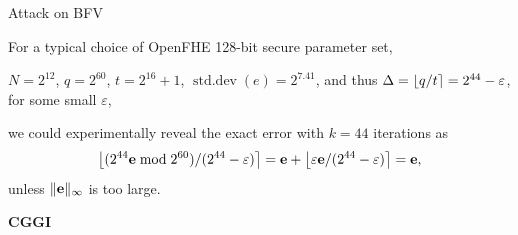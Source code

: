 \documentclass[handout]{beamer}
\begin{document}
    \begin{frame}{\krd Attack on BFV} 

    {

    For a typical choice of OpenFHE 128-bit secure parameter set, \vspace{0.3cm}
    
    $N = 2^{12}$, $q=2^{60}$, $t = 2^{16}+1$, $\operatorname{std.dev}(e) = 2^{7.41}$, and thus $\Delta = \left\lfloor q/t \right\rceil = 2^{44}-\varepsilon$, for some small $\varepsilon$, \vspace{0.3cm}
    
    we could experimentally reveal the exact error with $k=44$ iterations as
    \[
        \left\lfloor ({2^{44}\mathbf{e} \bmod 2^{60}})/(2^{44}-\varepsilon) \right\rceil = \mathbf{e} + \left\lfloor \varepsilon\mathbf{e} / (2^{44}-\varepsilon) \right\rceil = \mathbf{e},
    \]
    unless $\Vert\mathbf{e}\Vert_\infty$ is too large. 
    }
    \end{frame}

    \begin{frame}{}
    \begin{center}
        {\Huge \bf CGGI}
    \end{center} 
    \end{frame}   
    
\end{document}
